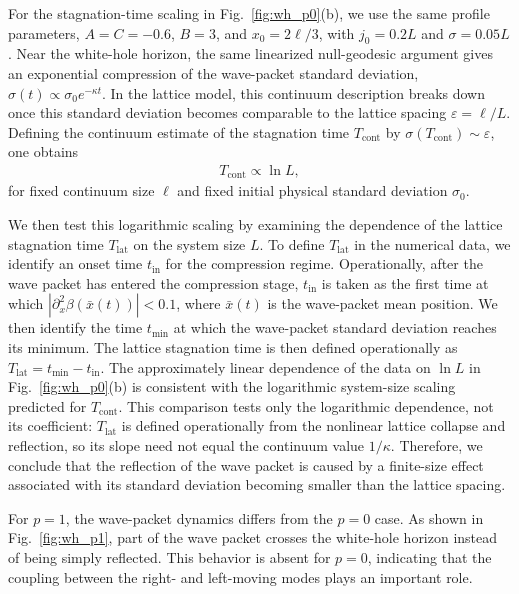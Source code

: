 \documentclass[reprint,amsmath,amssymb,aps,showkeys,superscriptaddress]{revtex4-2}
\begin{document}
For the stagnation-time scaling in Fig.~\ref{fig:wh_p0}(b), we use the same profile parameters, $A=C=-0.6$, $B=3$, and $x_0=2\ell/3$, with $j_0=0.2L$ and $\sigma=0.05L$.
Near the white-hole horizon, the same linearized null-geodesic argument gives an exponential compression of the wave-packet standard deviation, $\sigma(t)\propto\sigma_0 e^{-\kappa t}$.
In the lattice model, this continuum description breaks down once this standard deviation becomes comparable to the lattice spacing $\varepsilon=\ell/L$.
Defining the continuum estimate of the stagnation time $T_{\mathrm{cont}}$ by $\sigma(T_{\mathrm{cont}})\sim\varepsilon$, one obtains
\begin{align}
    T_{\mathrm{cont}} \propto \ln L ,
    \label{eq:T_logL}
\end{align}
for fixed continuum size $\ell$ and fixed initial physical standard deviation $\sigma_0$.

We then test this logarithmic scaling by examining the dependence of the lattice stagnation time $T_{\mathrm{lat}}$ on the system size $L$.
To define $T_{\mathrm{lat}}$ in the numerical data, we identify an onset time $t_{\mathrm{in}}$ for the compression regime.
Operationally, after the wave packet has entered the compression stage, $t_{\mathrm{in}}$ is taken as the first time at which
$|\partial_x^2\beta(\bar{x}(t))|<0.1$, where $\bar{x}(t)$ is the wave-packet mean position.
We then identify the time $t_{\mathrm{min}}$ at which the wave-packet standard deviation reaches its minimum.
The lattice stagnation time is then defined operationally as $T_{\mathrm{lat}} = t_{\mathrm{min}} - t_{\mathrm{in}}$.
The approximately linear dependence of the data on $\ln L$ in Fig.~\ref{fig:wh_p0}(b) is consistent with the logarithmic system-size scaling predicted for $T_{\mathrm{cont}}$.
This comparison tests only the logarithmic dependence, not its coefficient: $T_{\mathrm{lat}}$ is defined operationally from the nonlinear lattice collapse and reflection, so its slope need not equal the continuum value $1/\kappa$.
Therefore, we conclude that the reflection of the wave packet is caused by a finite-size effect associated with its standard deviation becoming smaller than the lattice spacing.

For $p=1$, the wave-packet dynamics differs from the $p=0$ case.
As shown in Fig.~\ref{fig:wh_p1}, part of the wave packet crosses the white-hole horizon instead of being simply reflected.
This behavior is absent for $p=0$, indicating that the coupling between the right- and left-moving modes plays an important role.
\end{document}
